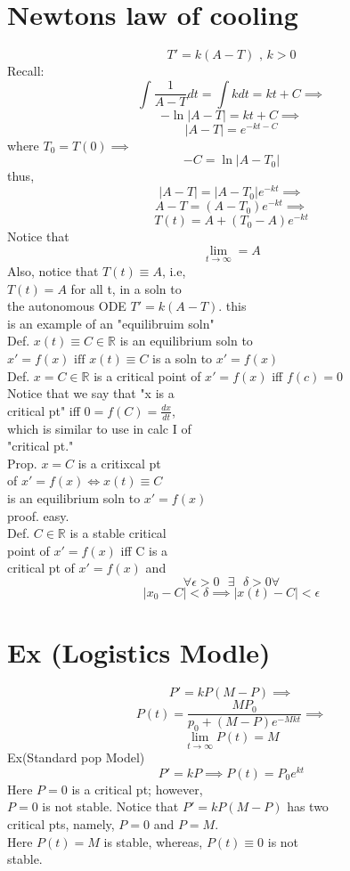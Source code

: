 \documentclass[10pt,a4paper]{article}
\begin{document}
\section*{ Newtons law of cooling} 
  \[ T' = k(A-T) \text{ , } k>0 \]
  Recall:
  \[ \int \frac{1}{A-T}dt = \int kdt = kt + C \implies \]
  \[ -\ln |A-T| = kt +C \implies  \]
  \[ |A-T| = e^{-kt-C} \]
  where \( T_0 = T(0) \implies  \)
  \[ -C = \ln |A-T_0|  \] thus, 
  \[ |A-T| = |A-T_0|e^{-kt} \implies \]
  \[ A-T = (A-T_0)e^{-kt} \implies \]
  \[ \boxed{T(t) = A + (T_0-A)e^{-kt} } \]
  Notice that 
  \[ \lim_{t \to \infty} = A \]
  Also, notice that \( T(t) \equiv A \),  i.e,\\
  \( T(t) = A \) for all t, in a soln to \\
  the autonomous ODE \( T' = k(A-T) \). this \\
  is  an example of an "equilibruim soln" \\[5mm] 
  Def. \( x(t) \equiv  C \in \mathbb{R} \) is an equilibrium soln to \\
  \( x' = f(x) \text{ iff } x(t) \equiv C \) is a soln to \( x' = f(x) \)
  \\[5mm]
  Def. \( x = C \in \mathbb{R}  \) is a critical point of \( x' = f(x) \)
  iff \( f(c) = 0 \)\\
  Notice that we say that "x is a \\
  critical pt" iff \( 0 = f(C) = \frac{dx}{dt} \), \\
  which is similar to use in calc I of  \\
  "critical pt." \\[5mm]
  Prop. \( x=C \) is a critixcal pt \\
  of \( x'=f(x) \iff x(t) \equiv  C \) \\
  is an equilibrium soln to \( x' = f(x) \) \\
  proof. easy. \\[5mm] 
  Def. \( C \in \mathbb{R} \) is a stable critical \\
  point of \( x' = f(x) \) iff C is a \\
  critical pt of \( x' = f(x)  \) and \\
  \[ \forall \epsilon >0 \text{  } \exists \text{  } \delta >0 \forall \]
  \[ |x_0 -C| < \delta  \implies |x(t) -C| < \epsilon  \]
\section*{Ex (Logistics Modle)}
  \[ P' = kP(M-P) \implies \]
  \[ P(t) = \frac{MP_0}{p_0 + (M - P) e^{-Mkt} } \implies  \]
  \[ \lim_{t \to \infty}P(t) = M \]
  Ex(Standard pop Model) 
  \[ P' = kP \implies P(t) = P_0 e^{kt}  \]
  Here \( P=0 \) is a critical pt; however, \\
  \( P=0  \) is not stable. 
  Notice that \( P' = kP(M-P)  \) has two \\
  critical pts, namely, \( P = 0 \) and \( P =M \). \\
  Here \( P(t) = M \) is stable, whereas, \( P(t) \equiv 0 \) is not \\
  stable.  \\[5mm]  
\end{document}
